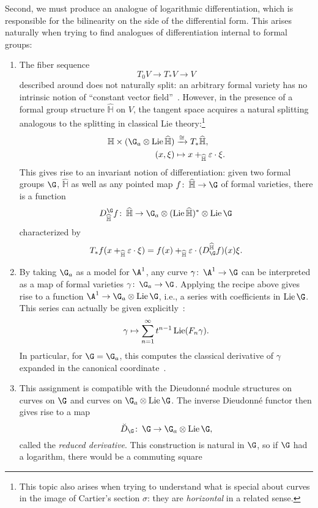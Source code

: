 Second, we must produce an analogue of logarithmic differentiation, which is responsible for the bilinearity on the side of the differential form.  This arises naturally when trying to find analogues of differentiation internal to formal groups:
\begin{enumerate}
    \item The fiber sequence \[T_0 V \to T_* V \to V\] described around  does not naturally split: an arbitrary formal variety has no intrinsic notion of ``constant vector field''~\cite[V.11.12]{LazardCFGs}.  However, in the presence of a formal group structure \(\widehat{\mathbb H}\) on \(V\), the tangent space acquires a natural splitting analogous to the splitting in classical Lie theory:\footnote{This topic also arises when trying to understand what is special about curves in the image of Cartier's section \(\sigma\): they are \emph{horizontal} in a related sense.}
    \begin{align*}
    \mathbb H \times (\G_a \otimes \Lie \widehat{\mathbb H}) & \xrightarrow{\cong} T_* \widehat{\mathbb H}, \\
    (x, \xi) & \mapsto x +_{\widehat{\mathbb H}} \eps \cdot \xi.
    \end{align*}
    This gives rise to an invariant notion of differentiation: given two formal groups \(\G\), \(\widehat{\mathbb H}\) as well as any pointed map \(f\co \widehat{\mathbb H} \to \G\) of formal varieties, there is a function \[D_{\widehat{\mathbb H}}^{\G} f\co \widehat{\mathbb H} \to \G_a \otimes (\Lie \widehat{\mathbb H})^* \otimes \Lie \G\] characterized by \[T_* f(x +_{\widehat{\mathbb H}} \eps \cdot \xi) = f(x) +_{\widehat{\mathbb H}} \eps \cdot (D_{\G}^{\widehat{\mathbb H}} f)(x) \xi.\]
    \item By taking \(\G_a\) as a model for \(\A^1\), any curve \(\gamma\co \A^1 \to \G\) can be interpreted as a map of formal varieties \(\gamma\co \G_a \to \G\).  Applying the recipe above gives rise to a function \(\A^1 \to \G_a \otimes \Lie \G\), i.e., a series with coefficients in \(\Lie \G\).  This series can actually be given explicitly~\cite[V.7.3]{LazardCFGs}: \[\gamma \mapsto \sum_{n=1}^\infty t^{n-1} \operatorname{Lie}(F_n \gamma).\]  In particular, for \(\G = \G_a\), this computes the classical derivative of \(\gamma\) expanded in the canonical coordinate~\cite[V.7.13]{LazardCFGs}.
    \item This assignment is compatible with the Dieudonn\'e module structures on curves on \(\G\) and curves on \(\G_a \otimes \Lie \G\).  The inverse Dieudonn\'e functor then gives rise to a map \[\breve D_{\G}\co \G \to \G_a \otimes \Lie \G,\] called the \textit{reduced derivative}.  This construction is natural in \(\G\), so if \(\G\) had a logarithm, there would be a commuting square

\end{enumerate}
